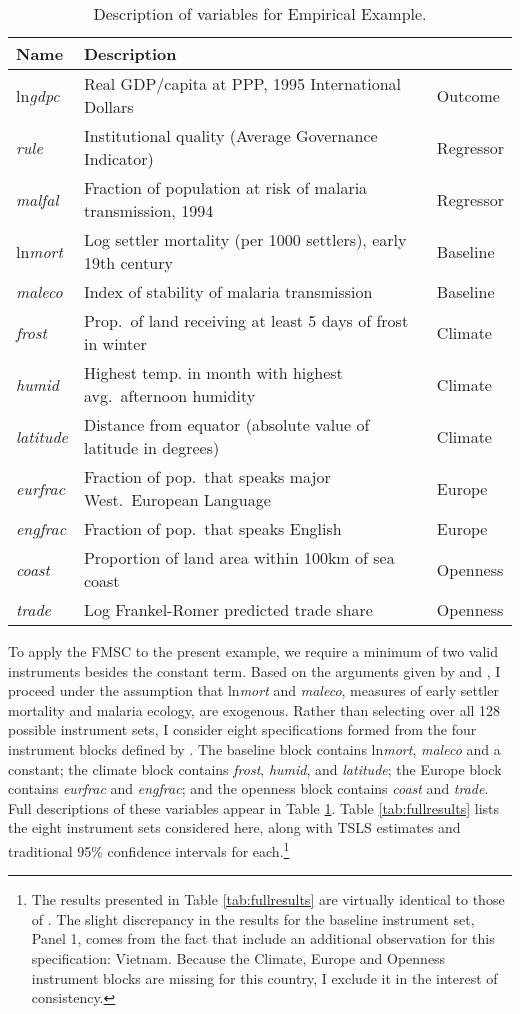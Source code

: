 \begin{table}[!tbp]
\small
\centering
\begin{tabular}{lll}
\hline \hline
Name& Description &\\
\hline
ln\emph{gdpc}&Real GDP/capita at PPP, 1995 International Dollars &Outcome\\
\emph{rule}&Institutional quality (Average Governance Indicator)&Regressor\\
\emph{malfal}&Fraction of population at risk of malaria transmission, 1994&Regressor\\
ln\emph{mort}&Log settler mortality (per 1000 settlers), early 19th century&Baseline\\
\emph{maleco}&Index of stability of malaria transmission&Baseline\\
\emph{frost}&Prop.\ of land receiving at least 5 days of frost in winter&Climate\\
\emph{humid}&Highest temp. in month with highest avg.\ afternoon humidity&Climate\\
\emph{latitude}&Distance from equator (absolute value of latitude in degrees)&Climate \\
\emph{eurfrac}&Fraction of pop.\ that speaks major West.\ European Language&Europe \\
\emph{engfrac}&Fraction of pop.\ that speaks English&Europe\\
\emph{coast}&Proportion of land area within 100km of sea coast&Openness\\
\emph{trade}&Log Frankel-Romer predicted trade share&Openness\\
\hline
\end{tabular}
\caption{Description of variables for Empirical Example.}
\label{tab:desc}
\end{table}

To apply the FMSC to the present example, we require a minimum of two valid instruments besides the constant term. 
Based on the arguments given by \cite{Acemoglu} and \cite{Sachs}, I proceed under the assumption that ln\emph{mort} and \emph{maleco}, measures of early settler mortality and malaria ecology, are exogenous.
Rather than selecting over all 128 possible instrument sets, I consider eight specifications formed from the four instrument blocks defined by \cite{Carstensen2006}.
The baseline block contains ln\emph{mort}, \emph{maleco} and a constant; the climate block contains \emph{frost}, \emph{humid}, and \emph{latitude}; the Europe block contains \emph{eurfrac} and \emph{engfrac}; and the openness block contains \emph{coast} and \emph{trade}. 
Full descriptions of these variables appear in Table \ref{tab:desc}.
Table \ref{tab:fullresults} lists the eight instrument sets considered here, along with TSLS estimates and traditional 95\% confidence intervals for each.\footnote{The results presented in Table \ref{tab:fullresults} are virtually identical to those of \cite{Carstensen2006}. The slight discrepancy in the results for the baseline instrument set, Panel 1, comes from the fact that \cite{Carstensen2006} include an additional observation for this specification: Vietnam. Because the Climate, Europe and Openness instrument blocks are missing for this country, I exclude it in the interest of consistency.}



